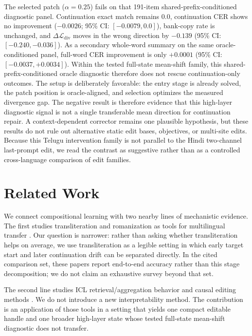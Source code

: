 \documentclass{article}
\begin{document}
The selected patch ($\alpha{=}0.25$) fails on that 191-item shared-prefix-conditioned diagnostic panel. Continuation exact match remains 0.0, continuation CER shows no improvement ($-0.0026$; 95\% CI: $[-0.0079, 0.0]$), bank-copy rate is unchanged, and $\Delta \mathcal{L}_{\mathrm{div}}$ moves in the wrong direction by $-0.139$ (95\% CI: $[-0.240, -0.036]$). As a secondary whole-word summary on the same oracle-conditioned panel, full-word CER improvement is only $+0.0001$ (95\% CI: $[-0.0037, +0.0034]$). Within the tested full-state mean-shift family, this shared-prefix-conditioned oracle diagnostic therefore does not rescue continuation-only outcomes. The setup is deliberately favorable: the entry stage is already solved, the patch position is oracle-aligned, and selection optimizes the measured divergence gap. The negative result is therefore evidence that this high-layer diagnostic signal is not a single transferable mean direction for continuation repair. A context-dependent corrector remains one plausible hypothesis, but these results do not rule out alternative static edit bases, objectives, or multi-site edits. Because this Telugu intervention family is not parallel to the Hindi two-channel last-prompt edit, we read the contrast as suggestive rather than as a controlled cross-language comparison of edit families.

\section{Related Work}

We connect compositional learning with two nearby lines of mechanistic evidence. The first studies transliteration and romanization as tools for multilingual transfer \citep{transliticl, romanlens, scriptbarrier}. Our question is narrower: rather than asking whether transliteration helps on average, we use transliteration as a legible setting in which early target start and later continuation drift can be separated directly. In the cited comparison set, these papers report end-to-end accuracy rather than this stage decomposition; we do not claim an exhaustive survey beyond that set.

The second line studies ICL retrieval/aggregation behavior and causal editing methods \citep{reticl_survey, olsson2022, contextualize, patchingbest, rome, iti, actadd}. We do not introduce a new interpretability method. The contribution is an application of those tools in a setting that yields one compact editable handle and one broader high-layer state whose tested full-state mean-shift diagnostic does not transfer.
\end{document}

